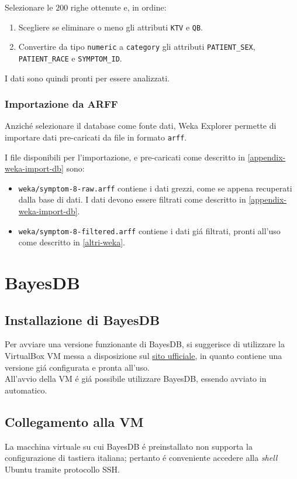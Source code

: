 \documentclass[preprint]{acm_proc_article-sp}
\begin{document}
Selezionare le $200$ righe ottenute e, in ordine:
\begin{enumerate}
\item Scegliere se eliminare o meno gli attributi \verb|KTV| e \verb|QB|.
\item Convertire da tipo \verb|numeric| a \verb|category| gli attributi \verb|PATIENT_SEX|, \verb|PATIENT_RACE| e \verb|SYMPTOM_ID|.
\end{enumerate}

I dati sono quindi pronti per essere analizzati.

\subsubsection{Importazione da ARFF}
Anzich\'e selezionare il database come fonte dati, Weka Explorer permette di importare dati pre-caricati da file in formato \verb|arff|.

I file disponibili per l'importazione, e pre-caricati come descritto in \ref{appendix-weka-import-db} sono:
\begin{itemize}
\item \verb|weka/symptom-8-raw.arff| contiene i dati grezzi, come se appena recuperati dalla base di dati. I dati devono essere filtrati come descritto in \ref{appendix-weka-import-db}.
\item \verb|weka/symptom-8-filtered.arff| contiene i dati gi\'a filtrati, pronti all'uso come descritto in \ref{altri-weka}.
\end{itemize}

\section{BayesDB}

\subsection{Installazione di BayesDB}
\label{appendix-bayesdb}
Per avviare una versione funzionante di BayesDB, si suggerisce di utilizzare la VirtualBox VM messa a disposizione sul \href{http://probcomp.csail.mit.edu/bayesdb/#Download}{sito ufficiale}, in quanto contiene una versione gi\'a configurata e pronta all'uso.\\
All'avvio della VM \'e gi\'a possibile utilizzare BayesDB, essendo avviato in automatico.

\subsection{Collegamento alla VM}
\label{appendix-bayesdb-collegamento}
La macchina virtuale su cui BayesDB \'e preinstallato non supporta la configurazione di tastiera italiana; pertanto \'e conveniente accedere alla \textit{shell} Ubuntu tramite protocollo SSH.
\end{document}
